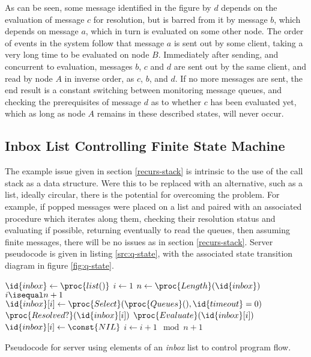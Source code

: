 As can be seen, some message identified in the figure by \(d\) depends on the
evaluation of message \(c\) for resolution, but is barred from it by message
\(b\), which depends on message \(a\), which in turn is evaluated on some other
node.
The order of events in the system follow that message \(a\) is sent out by some
client, taking a very long time to be evaluated on node \(B\).
Immediately after sending, and concurrent to evaluation, messages \(b\), \(c\)
and \(d\) are sent out by the same client, and read by node \(A\) in inverse
order, as \(c\), \(b\), and \(d\).
If no more messages are sent, the end result is a constant switching between
monitoring message queues, and checking the prerequisites of message \(d\) as
to whether \(c\) has been evaluated yet, which as long as node \(A\) remains in
these described states, will never occur.

\subsection{Inbox List Controlling Finite State Machine}
\label{inbox-list}

The example issue given in section \ref{recurs-stack} is intrinsic to the use
of the call stack as a data structure.
Were this to be replaced with an alternative, such as a list, ideally circular,
there is the potential for overcoming the problem.
For example, if popped messages were placed on a list and paired with an
associated procedure which iterates along them, checking their resolution
status and evaluating if possible, returning eventually to read the queues,
then assuming finite messages, there will be no issues as in section
\ref{recurs-stack}.
Server pseudocode is given in listing \ref{src:q-state}, with the associated
state transition diagram in figure \ref{fig:q-state}.

\begin{srcclrs}
\begin{codebox}
	\li \(\id{inbox} \gets \proc{list()}\)
	\li \(i \gets 1\)
	\li \Repeat
	\li \(n \gets \proc{Length}(\id{inbox})\)
	\li \If \(i \isequal n + 1\)
	\li \Then
	\(\id{inbox}[i] \gets \proc{Select}(\proc{Queues}(), \id{timeout}=0)\)
	\End
	\li \If \(\proc{Resolved?}(\id{inbox}[i])\)
	\li \Then
	\(\proc{Evaluate}(\id{inbox}[i])\)
	\li \(\id{inbox}[i] \gets \const{NIL}\)
	\End
	\li \(i \gets i + 1 \mod n + 1\)
	\End
\end{codebox}
	\caption{\label{src:q-state}Pseudocode for server using elements of an
	\textit{inbox} list to control program flow.}
\end{srcclrs}

